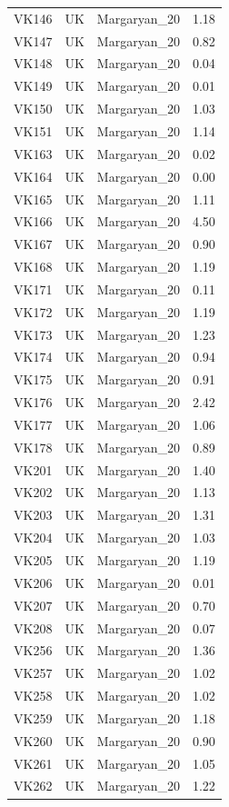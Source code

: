 \begin{longtable}[t]{lllr}
VK146 & UK & Margaryan\_20 & 1.18\\
VK147 & UK & Margaryan\_20 & 0.82\\
VK148 & UK & Margaryan\_20 & 0.04\\
VK149 & UK & Margaryan\_20 & 0.01\\
VK150 & UK & Margaryan\_20 & 1.03\\
VK151 & UK & Margaryan\_20 & 1.14\\
VK163 & UK & Margaryan\_20 & 0.02\\
VK164 & UK & Margaryan\_20 & 0.00\\
VK165 & UK & Margaryan\_20 & 1.11\\
VK166 & UK & Margaryan\_20 & 4.50\\
VK167 & UK & Margaryan\_20 & 0.90\\
VK168 & UK & Margaryan\_20 & 1.19\\
VK171 & UK & Margaryan\_20 & 0.11\\
VK172 & UK & Margaryan\_20 & 1.19\\
VK173 & UK & Margaryan\_20 & 1.23\\
VK174 & UK & Margaryan\_20 & 0.94\\
VK175 & UK & Margaryan\_20 & 0.91\\
VK176 & UK & Margaryan\_20 & 2.42\\
VK177 & UK & Margaryan\_20 & 1.06\\
VK178 & UK & Margaryan\_20 & 0.89\\
VK201 & UK & Margaryan\_20 & 1.40\\
VK202 & UK & Margaryan\_20 & 1.13\\
VK203 & UK & Margaryan\_20 & 1.31\\
VK204 & UK & Margaryan\_20 & 1.03\\
VK205 & UK & Margaryan\_20 & 1.19\\
VK206 & UK & Margaryan\_20 & 0.01\\
VK207 & UK & Margaryan\_20 & 0.70\\
VK208 & UK & Margaryan\_20 & 0.07\\
VK256 & UK & Margaryan\_20 & 1.36\\
VK257 & UK & Margaryan\_20 & 1.02\\
VK258 & UK & Margaryan\_20 & 1.02\\
VK259 & UK & Margaryan\_20 & 1.18\\
VK260 & UK & Margaryan\_20 & 0.90\\
VK261 & UK & Margaryan\_20 & 1.05\\
VK262 & UK & Margaryan\_20 & 1.22\\

\end{longtable}
